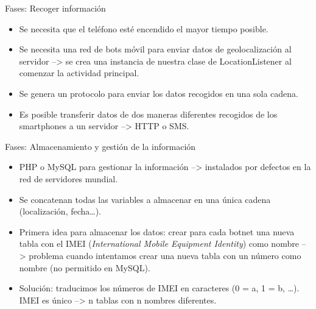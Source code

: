\documentclass[aspectratio=43]{beamer}
\begin{document}
\begin{frame}{Fases: Recoger información}
  
  \begin{itemize}
  
  \item Se necesita que el teléfono esté encendido el mayor tiempo posible.   
  
  \item Se necesita una red de bots móvil para enviar datos de geolocalización
al servidor --> se crea una instancia de nuestra clase de LocationListener al comenzar la actividad principal.

  \item Se genera un protocolo para enviar los datos recogidos en una sola cadena. 
  
  \item Es posible transferir datos de dos maneras diferentes
recogidos de los smartphones a un servidor --> HTTP o SMS.

  \end{itemize}
\end{frame}

\begin{frame}{Fases: Almacenamiento y gestión de la información}

\begin{itemize}
  
  \item PHP o MySQL para gestionar la información --> instalados por defectos en la red de servidores mundial.   

  \item Se concatenan todas las variables a almacenar en una única cadena (localización, fecha\ldots). 
  
  \item Primera idea para almacenar los datos: crear para cada botnet una nueva tabla con el IMEI (\emph{International Mobile Equipment Identity}) como nombre --> problema cuando intentamos crear una nueva tabla con un número como nombre (no permitido en MySQL).
  
  \item Solución: traducimos los números de IMEI en caracteres (0 = a, 1 = b, \ldots).  IMEI es único -->  n tablas con n nombres diferentes.

  \end{itemize}
  
\end{frame}
\end{document}
